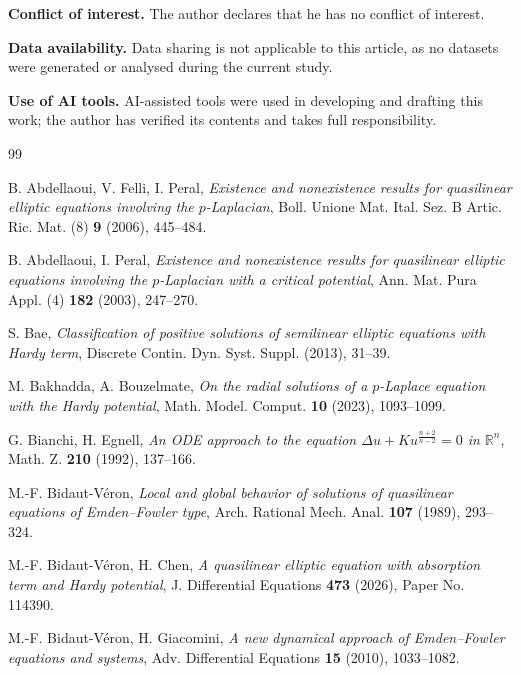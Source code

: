 \documentclass[11pt,reqno]{amsart}
\numberwithin{equation}{section}
\theoremstyle{plain}
\theoremstyle{definition}
\newcommand{\R}{\mathbb{R}}
\begin{document}
\smallskip
\noindent\textbf{Conflict of interest.} The author declares that he has no
conflict of interest.

\smallskip
\noindent\textbf{Data availability.} Data sharing is not applicable to this
article, as no datasets were generated or analysed during the current study.

\smallskip
\noindent\textbf{Use of AI tools.} AI-assisted tools were used in developing and drafting this work; the author has verified its contents and takes full responsibility.

\begin{thebibliography}{99}

B. Abdellaoui, V. Felli, I. Peral,
\emph{Existence and nonexistence results for quasilinear elliptic equations
involving the $p$-Laplacian},
Boll. Unione Mat. Ital. Sez. B Artic. Ric. Mat. (8) \textbf{9} (2006),
445--484.

B. Abdellaoui, I. Peral,
\emph{Existence and nonexistence results for quasilinear elliptic equations
involving the $p$-Laplacian with a critical potential},
Ann. Mat. Pura Appl. (4) \textbf{182} (2003), 247--270.

S. Bae,
\emph{Classification of positive solutions of semilinear elliptic equations with
Hardy term},
Discrete Contin. Dyn. Syst. Suppl. (2013), 31--39.

M. Bakhadda, A. Bouzelmate,
\emph{On the radial solutions of a $p$-Laplace equation with the Hardy
potential},
Math. Model. Comput. \textbf{10} (2023), 1093--1099.

G. Bianchi, H. Egnell,
\emph{An ODE approach to the equation $\Delta u+Ku^{\frac{n+2}{n-2}}=0$ in
$\R^{n}$},
Math. Z. \textbf{210} (1992), 137--166.

M.-F. Bidaut-V\'eron,
\emph{Local and global behavior of solutions of quasilinear equations of
Emden--Fowler type},
Arch. Rational Mech. Anal. \textbf{107} (1989), 293--324.

M.-F. Bidaut-V\'eron, H. Chen,
\emph{A quasilinear elliptic equation with absorption term and Hardy
potential},
J. Differential Equations \textbf{473} (2026), Paper No. 114390.

M.-F. Bidaut-V\'eron, H. Giacomini,
\emph{A new dynamical approach of Emden--Fowler equations and systems},
Adv. Differential Equations \textbf{15} (2010), 1033--1082.


\end{thebibliography}
\end{document}
